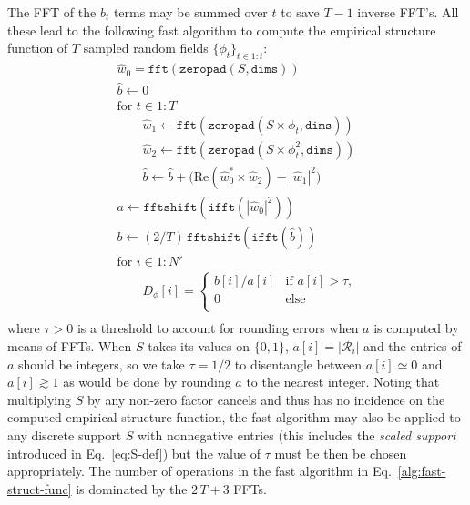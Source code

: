 \documentclass{article}
\renewcommand*{\Re}{\mathrm{Re}}
\begin{document}
The FFT of the $b_{t}$ terms may be summed over $t$ to save $T - 1$ inverse
FFT's. All these lead to the following fast algorithm to compute the empirical
structure function of $T$ sampled random fields $\{\phi_{t}\}_{t\in1:t}$:
\begin{equation}
  \label{alg:fast-struct-func}
  \begin{array}{l}
    \widehat{w}_{0} = \mathtt{fft}(\mathtt{zeropad}(S, \mathtt{dims}))\\
    \widehat{b} \gets 0\\
    \text{for $t \in 1:T$}\\
    \qquad \widehat{w}_{1} \gets
    \mathtt{fft}(\mathtt{zeropad}(S \times \phi_{t}, \mathtt{dims}))\\
    \qquad \widehat{w}_{2} \gets
    \mathtt{fft}(\mathtt{zeropad}(S \times \phi_{t}^{2}, \mathtt{dims}))\\
    \qquad \widehat{b} \gets \widehat{b} +\bigl(
    \Re(\widehat{w}_{0}^{*} \times \widehat{w}_{2})
    - |\widehat{w}_{1}|^{2}\bigr) \\
    a \gets \mathtt{fftshift}(\mathtt{ifft}(|\widehat{w}_{0}|^{2}))\\
    b \gets (2/T)\,\mathtt{fftshift}(\mathtt{ifft}(\widehat{b}))\\
    \text{for $i \in 1:N'$}\\
    \qquad D_{\phi}[i] = \begin{cases}
       b[i]/a[i] & \text{if $a[i] > \tau$,}\\
       0 & \text{else}\\
     \end{cases}\\
  \end{array}
\end{equation}
where $\tau > 0$ is a threshold to account for rounding errors when $a$ is
computed by means of FFTs. When $S$ takes its values on $\{0,1\}$,
$a[i] = |\mathcal{R}_{i}|$ and the entries of $a$ should be integers, so we
take $\tau = 1/2$ to disentangle between $a[i] \simeq 0$ and $a[i] \gtrsim 1$
as would be done by rounding $a$ to the nearest integer. Noting that
multiplying $S$ by any non-zero factor cancels and thus has no incidence on the
computed empirical structure function, the fast algorithm may also be applied
to any discrete support $S$ with nonnegative entries (this includes the
\emph{scaled support} introduced in Eq.~\eqref{eq:S-def}) but the value of
$\tau$ must be then be chosen appropriately. The number of operations in the
fast algorithm in Eq.~\eqref{alg:fast-struct-func} is dominated by the
$2\,T + 3$ FFTs.
\end{document}

